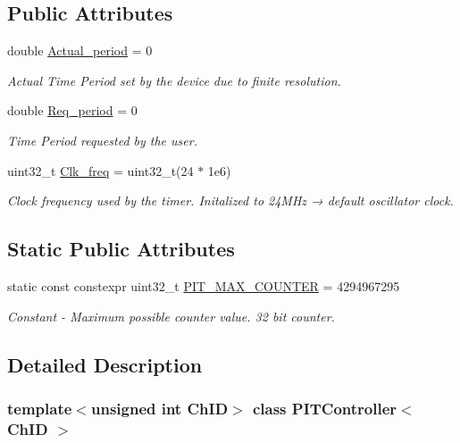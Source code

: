 \subsection*{Public Attributes}
\begin{DoxyCompactItemize}
\item 
double \hyperlink{classPITController_a549601e7c66941d7872a6e7d38ed9563}{Actual\+\_\+period} = 0
\begin{DoxyCompactList}\small\item\em Actual Time Period set by the device due to finite resolution. \end{DoxyCompactList}\item 
double \hyperlink{classPITController_a9de0af49a52145c8d2a8f4e90a519b60}{Req\+\_\+period} = 0
\begin{DoxyCompactList}\small\item\em Time Period requested by the user. \end{DoxyCompactList}\item 
uint32\+\_\+t \hyperlink{classPITController_ae3d74bb18e5b22769e895f592cb16129}{Clk\+\_\+freq} = uint32\+\_\+t(24 $\ast$ 1e6)
\begin{DoxyCompactList}\small\item\em Clock frequency used by the timer. Initalized to 24\+M\+Hz → default oscillator clock. \end{DoxyCompactList}\end{DoxyCompactItemize}
\subsection*{Static Public Attributes}
\begin{DoxyCompactItemize}
\item 
static const constexpr uint32\+\_\+t \hyperlink{classPITController_a53778fe7e47ac9741bef0bc190e0646a}{P\+I\+T\+\_\+\+M\+A\+X\+\_\+\+C\+O\+U\+N\+T\+ER} = 4294967295
\begin{DoxyCompactList}\small\item\em Constant -\/ Maximum possible counter value. 32 bit counter. \end{DoxyCompactList}\end{DoxyCompactItemize}


\subsection{Detailed Description}
\subsubsection*{template$<$unsigned int Ch\+ID$>$\newline
class P\+I\+T\+Controller$<$ Ch\+I\+D $>$}

